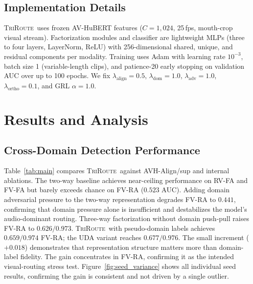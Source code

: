 \documentclass{article}
\newcommand{\method}{\textsc{TriRoute}}
\begin{document}
\subsection{Implementation Details}

\method\ uses frozen AV-HuBERT \citep{shi2022avhubert} features ($C=1{,}024$, 25\,fps, mouth-crop visual stream). Factorization modules and classifier are lightweight MLPs (three to four layers, LayerNorm, ReLU) with 256-dimensional shared, unique, and residual components per modality. Training uses Adam with learning rate $10^{-3}$, batch size 1 (variable-length clips), and patience-20 early stopping on validation AUC over up to 100 epochs. We fix $\lambda_{\mathrm{align}} = 0.5$, $\lambda_{\mathrm{dom}} = 1.0$, $\lambda_{\mathrm{adv}} = 1.0$, $\lambda_{\mathrm{ortho}} = 0.1$, and GRL $\alpha = 1.0$.

\section{Results and Analysis}

\subsection{Cross-Domain Detection Performance}

Table~\ref{tab:main} compares \method\ against AVH-Align/sup and internal ablations. The two-way baseline achieves near-ceiling performance on RV-FA and FV-FA but barely exceeds chance on FV-RA ($0.523$ AUC). Adding domain adversarial pressure to the two-way representation degrades FV-RA to $0.441$, confirming that domain pressure alone is insufficient and destabilizes the model's audio-dominant routing. Three-way factorization without domain push-pull raises FV-RA to $0.626/0.973$. \method\ with pseudo-domain labels achieves $0.659/0.974$ FV-RA; the UDA variant reaches $0.677/0.976$. The small increment ($+0.018$) demonstrates that representation structure matters more than domain-label fidelity. The gain concentrates in FV-RA, confirming it as the intended visual-routing stress test. Figure~\ref{fig:seed_variance} shows all individual seed results, confirming the gain is consistent and not driven by a single outlier.
\end{document}
